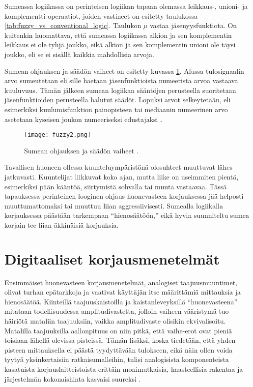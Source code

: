 \documentclass[finnish,12pt]{article}
\begin{document}
Sumeassa logiikassa on perinteisen logiikan tapaan olemassa leikkaus-, unioni- ja komplementti-operaatiot, joiden vastineet on esitetty taulukossa \ref{tab:fuzzy_vs_conventional_logic}. Taulukon $\mu$ vastaa jäsenyysfunktiota. On kuitenkin huomattava, että sumeassa logiikassa alkion ja sen komplementin leikkaus ei ole tyhjä joukko, eikä alkion ja sen komplementin unioni ole täysi joukko, eli se ei sisällä kaikkia mahdollisia arvoja. \cite[luku 2.1]{Harris1992}

Sumean ohjauksen ja säädön vaiheet on esitetty kuvassa \ref{fig:fuzzy step-by-step}. Alussa tulosignaalin arvo sumeutetaan eli sille haetaan jäsenfunktioista numeerista arvoa vastaava kuuluvuus. Tämän jälkeen sumean logiikan sääntöjen perusteella suoritetaan jäsenfunktioiden perusteella halutut säädöt. Lopuksi arvot selkeytetään, eli esimerkiksi kuulumisfunktion painopisteen tai mediaanin numeerinen arvo asetetaan kyseisen joukon numeeriseksi edustajaksi \cite[luku 2.3]{Harris1992}.

\begin{figure}[ht]
	\centering
	\texttt{[image: fuzzy2.png]}
	\caption{Sumean ohjauksen ja säädön vaiheet \cite[s. 19]{Harris1992}.}		\label{fig:fuzzy step-by-step}
\end{figure}

Tavallisen huoneen ollessa kuunteluympäristönä olosuhteet muuttuvat lähes jatkuvasti. Kuuntelijat liikkuvat koko ajan, mutta liike on useimmiten pientä, esimerkiksi pään kääntöä, siirtymistä sohvalla tai muuta vastaavaa. Tässä tapauksessa perinteinen looginen ohjaus huonevasteen korjauksessa jää helposti muuttumattomaksi tai muuttuu liian aggressiivisesti. Sumealla logiikalla korjauksessa päästään tarkempaan ``hienosäätöön,'' eikä hyvin suunniteltu sumea korjain tee liian äkkinäisiä korjauksia.

\clearpage

\section{Digitaaliset korjausmenetelmät}

Ensimmäiset huonevasteen korjausmenetelmät, analogiset taajuusmuuntimet, olivat turhan epätarkkoja ja vaativat käyttäjän itse määrittämiä mittauksia ja hienosäätöä. Kiinteillä taajuuskaistoilla ja kaistanleveyksillä ``huonevasteena'' mitataan todellisuudessa amplitudivastetta, jolloin vaiheen vääristymä tuo häiriötä mataliin taajuuksiin, vaikka amplitudivaste olisikin ekvivalisoitu. Matalilla taajuuksilla aallonpituus on niin pitkä, että vaihe-erot ovat pieniä toisiaan lähellä olevissa pisteissä. Tämän lisäksi, koska tiedetään, että yhden pisteen mittauksella ei päästä tyydyttävään tulokseen, eikä näin ollen voida tyytyä yksinkertaisiin ratkaisumalleihin, tulisi analogisista komponenteista kasatuista korjauslaitteistoista erittäin monimutkaisia, haasteellisia rakentaa ja järjestelmän kokonaishinta kasvaisi suureksi  \cite{MMiyoshi1988,SBharitkar2001,ACarini2012,S.J.Elliot1989,YHaneda1997}. 
\end{document}
